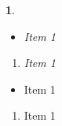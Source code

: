 \documentclass[9pt,trans]{beamer}
\theoremstyle{example}
\newtheorem{example}{\translate{Example}}
\begin{document}
\begin{frame}
    \begin{example}%
    \begin{itemize}
        \item Item 1
    \end{itemize}
    \begin{enumerate}
        \item Item 1
    \end{enumerate}
    \end{example}

        \begin{theorem}
    \begin{itemize}
        \item Item 1
    \end{itemize}
    \begin{enumerate}
        \item Item 1
    \end{enumerate}
\end{theorem}
\end{frame}
\end{document}
